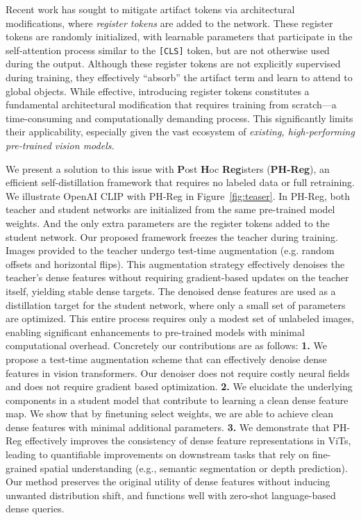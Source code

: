\documentclass{article}
\begin{document}
Recent work has sought to mitigate artifact tokens via architectural modifications, where \textit{register tokens} are added to the network. These register tokens are randomly initialized, with learnable parameters that participate in the self-attention process similar to the \texttt{[CLS]} token, but are not otherwise used during the output. Although these register tokens are not explicitly supervised during training, they effectively ``absorb'' the artifact term and learn to attend to global objects. While effective, introducing register tokens constitutes a fundamental architectural modification that requires training from scratch---a time-consuming and computationally demanding process. This significantly limits their applicability, especially given the vast ecosystem of \emph{existing, high-performing pre-trained vision models.} 

We present a solution to this issue with \textbf{P}ost \textbf{H}oc \textbf{Reg}isters (\textbf{PH-Reg}), an efficient self-distillation framework that requires no labeled data or full retraining. We illustrate OpenAI CLIP with PH-Reg in Figure~\ref{fig:teaser}. In PH-Reg, both teacher and student networks are initialized from the same pre-trained model weights. And the only extra parameters are the register tokens added to the student network. Our proposed framework freezes the teacher during training. Images provided to the teacher undergo test-time augmentation (e.g. random offsets and horizontal flips). This augmentation strategy effectively denoises the teacher's dense features without requiring gradient-based updates on the teacher itself, yielding stable dense targets. The denoised dense features are used as a distillation target for the student network, where only a small set of parameters are optimized. This entire process requires only a modest set of unlabeled images, enabling significant enhancements to pre-trained models with minimal computational overhead. Concretely our contributions are as follows: \textbf{1.} We propose a test-time augmentation scheme that can effectively denoise dense features in vision transformers. Our denoiser does not require costly neural fields and does not require gradient based optimization. \textbf{2.} We elucidate the underlying components in a student model that contribute to learning a clean dense feature map. We show that by finetuning select weights, we are able to achieve clean dense features with minimal additional parameters. \textbf{3.} We demonstrate that PH-Reg effectively improves the consistency of dense feature representations in ViTs, leading to quantifiable improvements on downstream tasks that rely on fine-grained spatial understanding (e.g., semantic segmentation or depth prediction). Our method preserves the original utility of dense features without inducing unwanted distribution shift, and functions well with zero-shot language-based dense queries. 
 \vspace{-.2cm}
\end{document}
